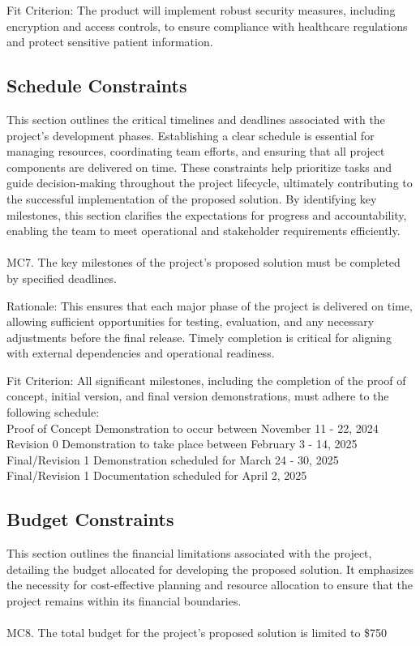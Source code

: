 \documentclass[12pt]{article}
\begin{document}
Fit Criterion: The product will implement robust security measures, including encryption and 
access controls, to ensure compliance with healthcare regulations and protect sensitive patient 
information.


\subsection{Schedule Constraints}
This section outlines the critical timelines and deadlines associated with the project’s 
development phases. Establishing a clear schedule is essential for managing resources, 
coordinating team efforts, and ensuring that all project components are delivered on time. These 
constraints help prioritize tasks and guide decision-making throughout the project lifecycle, 
ultimately contributing to the successful implementation of the proposed solution. By identifying 
key milestones, this section clarifies the expectations for progress and accountability, enabling 
the team to meet operational and stakeholder requirements efficiently.
\\\\
\noindent
MC7. The key milestones of the project’s proposed solution must be completed by specified 
deadlines.

Rationale: This ensures that each major phase of the project is delivered on time, allowing 
sufficient opportunities for testing, evaluation, and any necessary adjustments before the final 
release. Timely completion is critical for aligning with external dependencies and operational 
readiness.

Fit Criterion: All significant milestones, including the completion of the proof of concept, 
initial version, and final version demonstrations, must adhere to the following schedule:\\
Proof of Concept Demonstration to occur between November 11 - 22, 2024\\
Revision 0 Demonstration to take place between February 3 - 14, 2025\\
Final/Revision 1 Demonstration scheduled for March 24 - 30, 2025\\
Final/Revision 1 Documentation scheduled for April 2, 2025\\


\subsection{Budget Constraints}
This section outlines the financial limitations associated with the project, detailing the budget 
allocated for developing the proposed solution. It emphasizes the necessity for cost-effective 
planning and resource allocation to ensure that the project remains within its financial 
boundaries.
\\\\
\noindent
MC8. The total budget for the project’s proposed solution is limited to \$750
\end{document}
